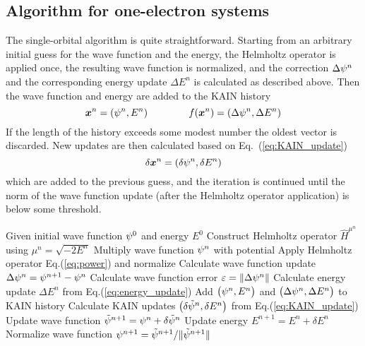 \subsection{Algorithm for one-electron systems}
The single-orbital algorithm is quite straightforward. Starting from an arbitrary initial
guess for the wave function and the energy, the Helmholtz operator is applied once, the 
resulting wave function is normalized, and the correction $\Delta\psi^n$ and the 
corresponding energy update $\Delta E^n$ is calculated as described above. Then the wave function
and energy are added to the KAIN history
\begin{equation}
    \boldsymbol x^n = \left(\psi^n,E^n\right)\qquad \qquad
    f(\boldsymbol x^n) = \left(\Delta\psi^n,\Delta E^n\right)
\end{equation}
If the length of the history exceeds some modest number the oldest vector is discarded. 
New updates are then calculated based on Eq.~(\ref{eq:KAIN_update})
\begin{equation}
    \delta \boldsymbol x^n = \left(\delta\psi^n, \delta E^n\right)
\end{equation}
which are added to the previous guess, and the iteration is continued until the norm of the
wave function update (after the Helmholtz operator application) is below some threshold.
\begin{algorithm}
\begin{algorithmic}[1]
\STATE Given initial wave function $\psi^0$ and energy $E^0$
    \STATE Construct Helmholtz operator $\hat{H}^{\mu^n}$ using $\mu^n = \sqrt{-2E^n}$
    \STATE Multiply wave function $\psi^n$ with potential
    \STATE Apply Helmholtz operator Eq.(\ref{eq:power}) and normalize
    \STATE Calculate wave function update $\Delta\psi^n = \psi^{n+1}-\psi^n$
    \STATE Calculate wave function error $\varepsilon = \|\Delta\psi^n\|$ 
    \STATE Calculate energy update $\Delta{E}^n$ from Eq.(\ref{eq:energy_update})
    \STATE Add $\big(\psi^n, E^n\big)$ and $\big(\Delta\psi^n,\Delta E^n\big)$
	    to KAIN history
    \STATE Calculate KAIN updates $\big(\delta\tilde{\psi}^n,\delta{E}^n\big)$ from 
	    Eq.(\ref{eq:KAIN_update}) 
    \STATE Update wave function 
	    $\tilde{\psi}^{n+1} = \psi^n + \delta\tilde{\psi}^n$
    \STATE Update energy $E^{n+1} = E^n+\delta{E}^n$
    \STATE Normalize wave function 
	    $\psi^{n+1} = \tilde{\psi}^{n+1}/\|\tilde{\psi}^{n+1}\|$
\ENDWHILE
\end{algorithmic}
\end{algorithm}

